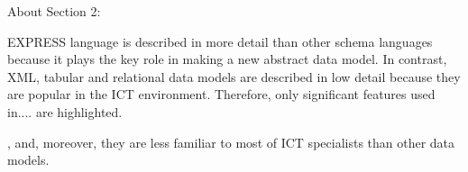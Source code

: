 About Section 2:



EXPRESS language is described in more detail than other schema languages because it plays the key role in making a new abstract data model.
In contrast, XML, tabular and relational data models are described in low detail because they are popular in the ICT environment.
Therefore, only significant features used in.... are highlighted.

, and, moreover, they are less familiar to most of ICT specialists than other data models.